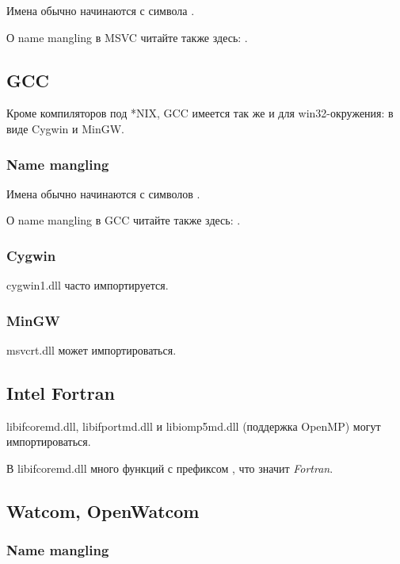 Имена обычно начинаются с символа .

О \gls{name mangling} в MSVC читайте также здесь: .

\subsection{GCC}

Кроме компиляторов под *NIX, GCC имеется так же и для win32-окружения: в виде Cygwin и MinGW.

\subsubsection{Name mangling}

Имена обычно начинаются с символов .

О \gls{name mangling} в GCC читайте также здесь: .

\subsubsection{Cygwin}

cygwin1.dll часто импортируется.

\subsubsection{MinGW}

msvcrt.dll может импортироваться.

\subsection{Intel Fortran}

libifcoremd.dll, libifportmd.dll и libiomp5md.dll (поддержка OpenMP) могут импортироваться.

В libifcoremd.dll много функций с префиксом , что значит \emph{Fortran}.

\subsection{Watcom, OpenWatcom}

\subsubsection{Name mangling}

